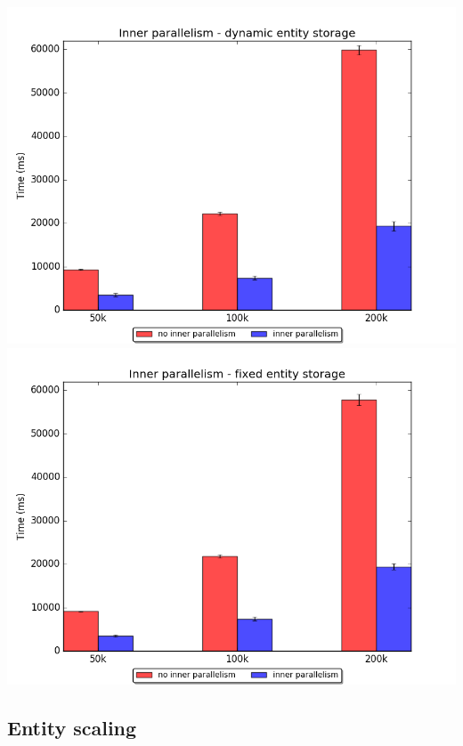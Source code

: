 \documentclass[twoside, 12pt, a4paper, openright]{book}
\begin{document}
\includegraphics{source/figures/bench/ipcomp_dynamic.png}
\includegraphics{source/figures/bench/ipcomp_fixed.png}

\subsection{Entity scaling}\label{entity-scaling}
\end{document}
